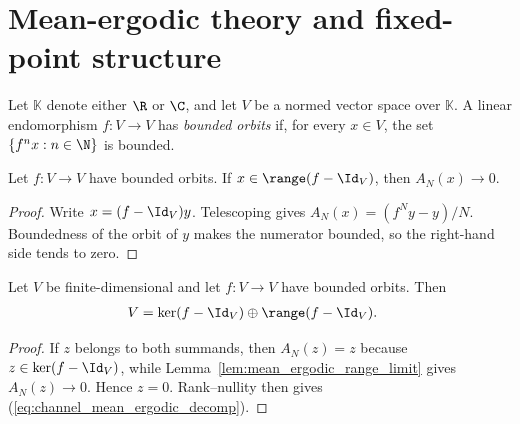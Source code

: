 \section{Mean-ergodic theory and fixed-point structure}

\begin{definition}
    \label{def:has_bounded_orbits}
    \leanok
    Let $\mathbb K$ denote either $\R$ or $\C$, and let $V$ be a normed
    vector space over $\mathbb K$. A linear endomorphism $f:V\to V$ has
    \emph{bounded orbits} if, for every $x\in V$, the set
    $\{f^n x:n\in\N\}$ is bounded.
\end{definition}

\begin{lemma}
    \label{lem:mean_ergodic_range_limit}
    \leanok
    Let $f:V\to V$ have bounded orbits. If
    $x\in\range(f-\Id_V)$, then $A_N(x)\longrightarrow 0$.
\end{lemma}

\begin{proof}\leanok
    Write $x=(f-\Id_V)y$. Telescoping gives
    $A_N(x)=(f^Ny-y)/N$. Boundedness of the orbit of $y$ makes the
    numerator bounded, so the right-hand side tends to zero.
\end{proof}

\begin{lemma}
    \label{lem:mean_ergodic_complementarity}
    \leanok
    Let $V$ be finite-dimensional and let $f:V\to V$ have bounded orbits.
    Then
    \begin{align}
        V
         & =\ker(f-\Id_V)\oplus\range(f-\Id_V).
        \label{eq:channel_mean_ergodic_decomp}
    \end{align}
\end{lemma}

\begin{proof}\leanok
    If $z$ belongs to both summands, then $A_N(z)=z$ because
    $z\in\ker(f-\Id_V)$, while Lemma~\ref{lem:mean_ergodic_range_limit} gives
    $A_N(z)\to0$. Hence $z=0$. Rank--nullity then gives
    (\ref{eq:channel_mean_ergodic_decomp}).
\end{proof}

